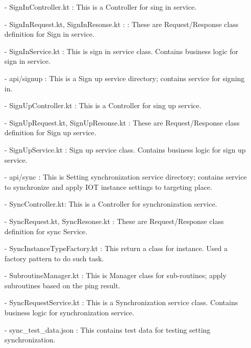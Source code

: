 \documentclass[conference]{IEEEtran}
\begin{document}
\begin{enumerate}
        \item [-] SignInController.kt : This is a Controller for sing in service.\\
        \item [-] SignInRequest.kt, SignInResonse.kt : : These are Request/Response class definition for Sign in service.\\
        \item [-] SignInService.kt : This is sign in service class. Contains business logic for sign in service.
        \item [-] api/signup : This is a Sign up service directory; contains service for signing in.\\
        \item [-] SignUpController.kt : This is a Controller for sing up service.\\
        \item [-] SignUpRequest.kt, SignUpResonse.kt : These are Request/Response class definition for Sign up service.\\
        \item [-] SignUpService.kt : Sign up service class. Contains business logic for sign up service.\\
        \item [-] api/sync : This is Setting synchronization service directory; contains service to synchronize and apply IOT
instance settings to targeting place.\\
        \item [-] SyncController.kt: This is a  Controller for synchronization service.\\
        \item [-] SyncRequest.kt, SyncResonse.kt : These are Request/Response class definition for sync Service.\\
        \item [-] SyncInstanceTypeFactory.kt : This return a class for instance. Used a factory pattern to do such task.\\
        \item [-] SubroutineManager.kt : This is Manager class for sub-routines; apply subroutines based on the ping result.\\
        \item [-] SyncRequestService.kt : This is a Synchronization service class. Contains business logic for synchronization service.\\
        \item [-] sync\_test\_data.json  : This contains test data for testing setting synchronization.\\

\end{enumerate}
\end{document}

